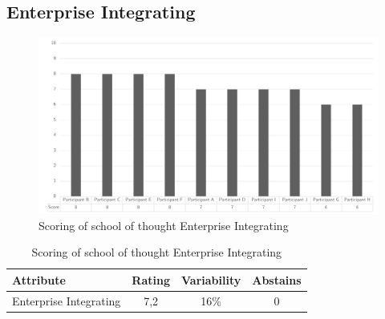 \subsection{Enterprise Integrating}
\begin{figure}[H]
	\centering
	\includegraphics[width=0.9\linewidth]{images/scoreeaschoolenterpriseintegrating}
	\caption[Scoring of school of thought Enterprise Integrating]{Scoring of school of thought Enterprise Integrating}
	\label{fig:appscoringschoolenterpriseintegrating}
\end{figure}
\begin{table}[H]
	\centering
	\begin{tabular}{p{}ccc}
		\toprule
		\textbf{Attribute} & \textbf{Rating} & \textbf{Variability} & \textbf{Abstains} \\
		\midrule
		Enterprise Integrating & 7,2 & 16\% & 0 \\%
		\bottomrule
	\end{tabular}%
	\caption[Scoring of school of thought Enterprise Integrating]{Scoring of school of thought Enterprise Integrating}
	\label{tab:appscoringschoolenterpriseintegrating}%
\end{table}%
\newpage
